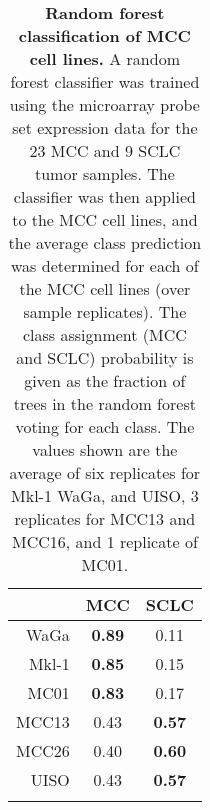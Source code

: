 \documentclass[10pt]{article}
\begin{document}
\clearpage



    
    
  

\clearpage

\begin{table}[H]

  \begin{center}
    
    \caption{
      \textbf{Random forest classification of MCC cell lines.}
      A random forest classifier was trained using the microarray probe set expression data for the 23 MCC and 9 SCLC tumor samples.
      The classifier was then applied to the MCC cell lines, and the average class prediction was determined for each of the MCC cell lines (over sample replicates).
      The class assignment (MCC and SCLC) probability is given as the fraction of trees in the random forest voting for each class.
      The values shown are the average of six replicates for Mkl-1 WaGa,  and UISO, 3 replicates for MCC13 and MCC16, and 1 replicate of MC01.
    }
    
    \begin{tabular}{rcc}
      \hline 
      & MCC  & SCLC \tabularnewline
      \hline 
      WaGa & \textbf{0.89} & 0.11\tabularnewline
      Mkl-1 & \textbf{0.85} & 0.15\tabularnewline
      MC01 & \textbf{0.83} & 0.17\tabularnewline
      MCC13 &0.43 & \textbf{0.57}\tabularnewline
      MCC26 & 0.40 & \textbf{0.60}\tabularnewline
      UISO & 0.43 & \textbf{0.57}\tabularnewline
      \hline 
      \label{tab:classifier}

    \end{tabular}
    
  \end{center}
  
\end{table}
\end{document}
